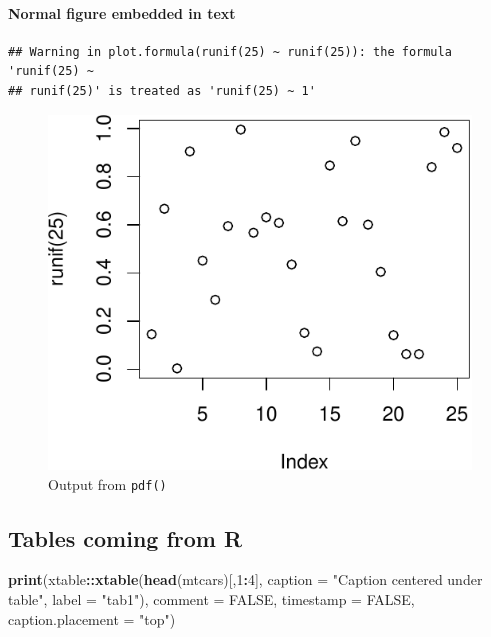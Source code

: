 \documentclass[useAMS,usenatbib,referee]{biom}
\newenvironment{Shaded}{\begin{snugshade}}{\end{snugshade}}
\newcommand{\KeywordTok}[1]{\textcolor[rgb]{0.13,0.29,0.53}{\textbf{#1}}}
\newcommand{\DataTypeTok}[1]{\textcolor[rgb]{0.13,0.29,0.53}{#1}}
\newcommand{\DecValTok}[1]{\textcolor[rgb]{0.00,0.00,0.81}{#1}}
\newcommand{\StringTok}[1]{\textcolor[rgb]{0.31,0.60,0.02}{#1}}
\newcommand{\OtherTok}[1]{\textcolor[rgb]{0.56,0.35,0.01}{#1}}
\newcommand{\OperatorTok}[1]{\textcolor[rgb]{0.81,0.36,0.00}{\textbf{#1}}}
\newcommand{\NormalTok}[1]{#1}
\begin{document}
\paragraph{Normal figure embedded in
text}\label{normal-figure-embedded-in-text}

\begin{verbatim}
## Warning in plot.formula(runif(25) ~ runif(25)): the formula 'runif(25) ~
## runif(25)' is treated as 'runif(25) ~ 1'
\end{verbatim}

\begin{figure}
\centering
\includegraphics{longitudinal-surrogate-marker-manuscript_files/figure-latex/fig2-1.pdf}
\caption{Output from \texttt{pdf()}}
\end{figure}

\clearpage

\subsection{Tables coming from R}\label{tables-coming-from-r}

\begin{Shaded}
\begin{Highlighting}[]
\KeywordTok{print}\NormalTok{(xtable}\OperatorTok{::}\KeywordTok{xtable}\NormalTok{(}\KeywordTok{head}\NormalTok{(mtcars)[,}\DecValTok{1}\OperatorTok{:}\DecValTok{4}\NormalTok{], }
\DataTypeTok{caption =} \StringTok{"Caption centered under table"}\NormalTok{, }\DataTypeTok{label =} \StringTok{"tab1"}\NormalTok{), }
\DataTypeTok{comment =} \OtherTok{FALSE}\NormalTok{, }\DataTypeTok{timestamp =} \OtherTok{FALSE}\NormalTok{, }\DataTypeTok{caption.placement =} \StringTok{"top"}\NormalTok{)}
\end{Highlighting}
\end{Shaded}
\end{document}
